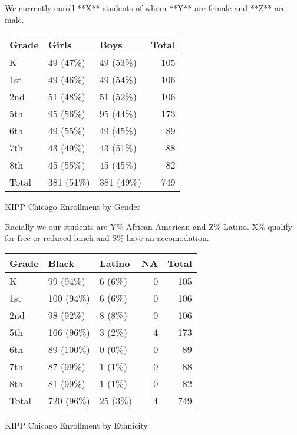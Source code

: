 \documentclass[sfsidenotes, justified]{tufte-handout}\usepackage{graphicx, color}
\begin{document}
We currently enroll **X** students of whom **Y** are female and **Z** are male. 
\begin{margintable}

{\small
\begin{tabular}{lllr}
  \hline
Grade & Girls & Boys & Total \\ 
  \hline
K & 49 (47\%) & 49 (53\%) & 105 \\ 
  1st & 49 (46\%) & 49 (54\%) & 106 \\ 
  2nd & 51 (48\%) & 51 (52\%) & 106 \\ 
  5th & 95 (56\%) & 95 (44\%) & 173 \\ 
  6th & 49 (55\%) & 49 (45\%) &  89 \\ 
  7th & 43 (49\%) & 43 (51\%) &  88 \\ 
  8th & 45 (55\%) & 45 (45\%) &  82 \\ 
  Total & 381 (51\%) & 381 (49\%) & 749 \\ 
   \hline
\end{tabular}
}



\caption{KIPP Chicago Enrollment by Gender}
\end{margintable}
  
Racially we our students are Y\% African American and Z\% Latino.  X\% qualify for free or reduced lunch and S\% have an accomodation.

\begin{margintable}

{\small
\begin{tabular}{lllrr}
  \hline
Grade & Black & Latino & NA & Total \\ 
  \hline
K & 99 (94\%) & 6 (6\%) &   0 & 105 \\ 
  1st & 100 (94\%) & 6 (6\%) &   0 & 106 \\ 
  2nd & 98 (92\%) & 8 (8\%) &   0 & 106 \\ 
  5th & 166 (96\%) & 3 (2\%) &   4 & 173 \\ 
  6th & 89 (100\%) & 0 (0\%) &   0 &  89 \\ 
  7th & 87 (99\%) & 1 (1\%) &   0 &  88 \\ 
  8th & 81 (99\%) & 1 (1\%) &   0 &  82 \\ 
  Total & 720 (96\%) & 25 (3\%) &   4 & 749 \\ 
   \hline
\end{tabular}
}



\caption{KIPP Chicago Enrollment by Ethnicity}
\end{margintable}
\end{document}
